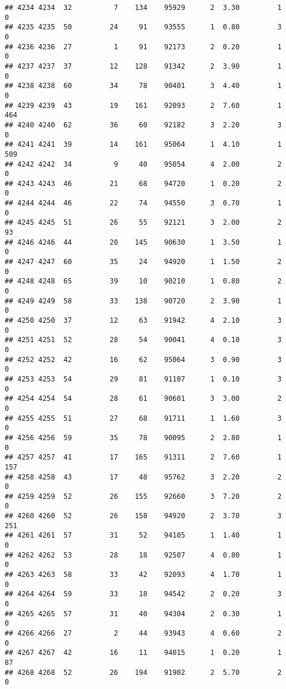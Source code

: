 \documentclass[
]{article}
\begin{document}
\begin{verbatim}
## 4234 4234  32          7    134    95929      2  3.30         1        0
## 4235 4235  50         24     91    93555      1  0.80         3        0
## 4236 4236  27          1     91    92173      2  0.20         1        0
## 4237 4237  37         12    128    91342      2  3.90         1        0
## 4238 4238  60         34     78    90401      3  4.40         1        0
## 4239 4239  43         19    161    92093      2  7.60         1      464
## 4240 4240  62         36     60    92182      3  2.20         3        0
## 4241 4241  39         14    161    95064      1  4.10         1      509
## 4242 4242  34          9     40    95054      4  2.00         2        0
## 4243 4243  46         21     68    94720      1  0.20         2        0
## 4244 4244  46         22     74    94550      3  0.70         1        0
## 4245 4245  51         26     55    92121      3  2.00         2       93
## 4246 4246  44         20    145    90630      1  3.50         1        0
## 4247 4247  60         35     24    94920      1  1.50         2        0
## 4248 4248  65         39     10    90210      1  0.80         2        0
## 4249 4249  58         33    138    90720      2  3.90         1        0
## 4250 4250  37         12     63    91942      4  2.10         3        0
## 4251 4251  52         28     54    90041      4  0.10         3        0
## 4252 4252  42         16     62    95064      3  0.90         3        0
## 4253 4253  54         29     81    91107      1  0.10         3        0
## 4254 4254  54         28     61    90601      3  3.00         2        0
## 4255 4255  51         27     68    91711      1  1.60         3        0
## 4256 4256  59         35     78    90095      2  2.80         1        0
## 4257 4257  41         17    165    91311      2  7.60         1      157
## 4258 4258  43         17     48    95762      3  2.20         2        0
## 4259 4259  52         26    155    92660      3  7.20         2        0
## 4260 4260  52         26    158    94920      2  3.70         3      251
## 4261 4261  57         31     52    94105      1  1.40         1        0
## 4262 4262  53         28     18    92507      4  0.80         1        0
## 4263 4263  58         33     42    92093      4  1.70         1        0
## 4264 4264  59         33     18    94542      2  0.20         3        0
## 4265 4265  57         31     40    94304      2  0.30         1        0
## 4266 4266  27          2     44    93943      4  0.60         2        0
## 4267 4267  42         16     11    94015      1  0.20         1       87
## 4268 4268  52         26    194    91902      2  5.70         2        0

\end{verbatim}
\end{document}
